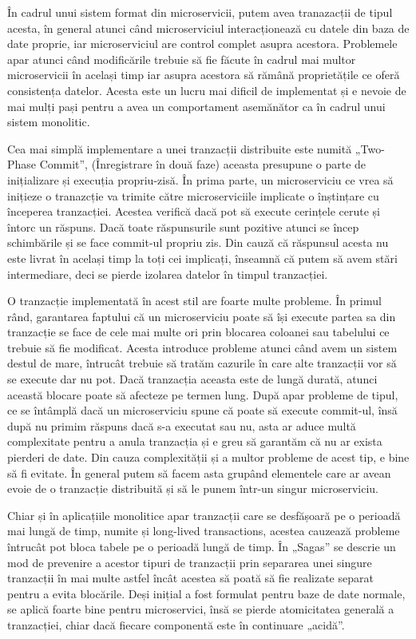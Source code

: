 În cadrul unui sistem format din microservicii, putem avea tranazacții de tipul acesta,
în general atunci când microserviciul interacționează cu datele din baza de date proprie,
iar microserviciul are control complet asupra acestora. Problemele apar atunci când 
modificările trebuie să fie făcute în cadrul mai multor microservicii în același timp
iar asupra acestora să rămână proprietățile ce oferă consistența datelor. Acesta este un
lucru mai dificil de implementat și e nevoie de mai mulți pași pentru a avea un comportament
asemănător ca în cadrul unui sistem monolitic.

Cea mai simplă implementare a unei tranzacții distribuite este numită „Two-Phase Commit”,
(Înregistrare în două faze) aceasta presupune o parte de inițializare și execuția propriu-zisă.
În prima parte, un microserviciu ce vrea să inițieze o tranazcție va trimite către microserviciile
implicate o înștințare cu începerea tranzacției. Acestea verifică dacă pot să execute cerințele
cerute și întorc un răspuns. Dacă toate răspunsurile sunt pozitive atunci se încep schimbările
și se face commit-ul propriu zis. Din cauză că răspunsul acesta nu este livrat în același timp la 
toți cei implicați, înseamnă că putem să avem stări intermediare, deci se pierde izolarea datelor 
în timpul tranzacției.

O tranzacție implementată în acest stil are foarte multe probleme. În primul rând, garantarea
faptului că un microserviciu poate să își execute partea sa din tranzacție se face de cele
mai multe ori prin blocarea coloanei sau tabelului ce trebuie să fie modificat. Acesta introduce
probleme atunci când avem un sistem destul de mare, întrucât trebuie să tratăm cazurile în 
care alte tranzacții vor să se execute dar nu pot. Dacă tranzacția aceasta este de lungă durată,
atunci această blocare poate să afecteze pe termen lung. După apar probleme de tipul, ce se întâmplă
dacă un microserviciu spune că poate să execute commit-ul, însă după nu primim răspuns dacă s-a executat sau nu,
asta ar aduce multă complexitate pentru a anula tranzacția și e greu să garantăm că nu ar
exista pierderi de date. Din cauza complexității și a multor probleme de acest tip, e bine să
fi evitate. În general putem să facem asta grupând elementele care ar avean evoie de o tranzacție 
distribuită și să le punem într-un singur microserviciu.

Chiar și în aplicațiile monolitice apar tranzacții care se desfășoară pe o perioadă mai lungă
de timp, numite și long-lived transactions, acestea cauzează probleme întrucât pot bloca
tabele pe o perioadă lungă de timp. În „Sagas”\cite{DBLP:conf/sigmod/Garcia-MolinaS87} se 
descrie un mod de prevenire a acestor tipuri de tranzacții prin separarea unei singure
tranzacții în mai multe astfel încât acestea să poată să fie realizate separat pentru 
a evita blocările. Deși inițial a fost formulat pentru baze de date normale, se aplică foarte
bine pentru microservici, însă se pierde atomicitatea generală a tranzacției, chiar dacă 
fiecare componentă este în continuare „acidă”.

